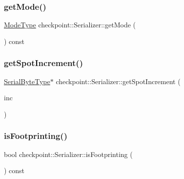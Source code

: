 \mbox{\label{structcheckpoint_1_1_serializer_a2b22a87a81fb9ff1b00dd96bbe4debe2}} 
\subsubsection{\texorpdfstring{get\+Mode()}{getMode()}}
{\footnotesize\ttfamily \hyperlink{namespacecheckpoint_ae2509499ccd8b1dc48fb535bf8aa3059}{Mode\+Type} checkpoint\+::\+Serializer\+::get\+Mode (\begin{DoxyParamCaption}{ }\end{DoxyParamCaption}) const\hspace{0.3cm}{\ttfamily [inline]}}

\mbox{\label{structcheckpoint_1_1_serializer_af2fc82901c31232b7549b20a8732de30}} 
\subsubsection{\texorpdfstring{get\+Spot\+Increment()}{getSpotIncrement()}}
{\footnotesize\ttfamily \hyperlink{namespacecheckpoint_ae57f01cdc0b81776c23b6c7c934c58f5}{Serial\+Byte\+Type}$\ast$ checkpoint\+::\+Serializer\+::get\+Spot\+Increment (\begin{DoxyParamCaption}\item[{\hyperlink{namespacecheckpoint_a083f6674da3f94c2901b18c6d238217c}{Serial\+Size\+Type} const}]{inc }\end{DoxyParamCaption})\hspace{0.3cm}{\ttfamily [inline]}}

\mbox{\label{structcheckpoint_1_1_serializer_a01f395bfaa39a8311925c71537877378}} 
\subsubsection{\texorpdfstring{is\+Footprinting()}{isFootprinting()}}
{\footnotesize\ttfamily bool checkpoint\+::\+Serializer\+::is\+Footprinting (\begin{DoxyParamCaption}{ }\end{DoxyParamCaption}) const\hspace{0.3cm}{\ttfamily [inline]}}

